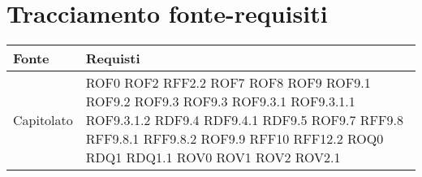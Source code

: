 \documentclass[../AnalisideiRequisiti.tex]{subfiles}
\begin{document}
	\section{Tracciamento fonte-requisiti}
	\begin{longtable}{| p{4cm} | p{4cm} |}
		\hline
		\textbf{Fonte} & \textbf{Requisti} \\
			\hline
		\endhead
		\newline Capitolato & \newline ROF0 \newline ROF2 \newline RFF2.2 \newline ROF7 \newline ROF8 \newline ROF9 \newline ROF9.1 \newline ROF9.2 \newline ROF9.3 \newline ROF9.3 \newline ROF9.3.1 \newline ROF9.3.1.1 \newline ROF9.3.1.2 \newline RDF9.4 \newline RDF9.4.1 \newline RDF9.5 \newline ROF9.7 \newline RFF9.8 \newline RFF9.8.1 \newline RFF9.8.2 \newline ROF9.9 \newline RFF10 \newline RFF12.2 \newline ROQ0 \newline RDQ1 \newline RDQ1.1 \newline ROV0 \newline ROV1 \newline ROV2 \newline ROV2.1 \\[1em]
	\hline	

\end{longtable}
\end{document}
